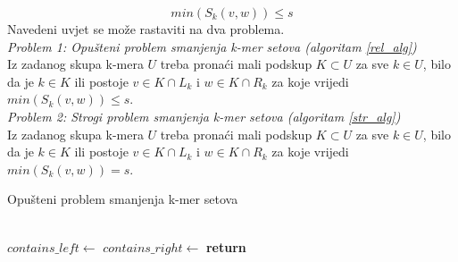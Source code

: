 \documentclass[times, utf8, seminar, numeric]{fer}
\begin{document}
\begin{equation}
  \label{distance}
  min(S_k(v,w)) \leq s
\end{equation}
Navedeni uvjet se može rastaviti na dva problema.\\
\textit{Problem 1: Opušteni problem smanjenja k-mer setova (algoritam \ref{rel_alg})}\nopagebreak\\
Iz zadanog skupa k-mera {$U$} treba pronaći mali podskup {$K \subset U$} za sve
{$k \in U$}, bilo da je {$k \in K$} ili postoje {$v \in K \cap L_k$} i
{$w \in K \cap R_k$} za koje vrijedi {$min(S_k(v,w)) \leq s$}.\\
\textit{Problem 2: Strogi problem smanjenja k-mer setova (algoritam \ref{str_alg})}\nopagebreak\\
Iz zadanog skupa k-mera {$U$} treba pronaći mali podskup {$K \subset U$} za sve
{$k \in U$}, bilo da je {$k \in K$} ili postoje {$v \in K \cap L_k$} i
{$w \in K \cap R_k$} za koje vrijedi {$min(S_k(v,w)) = s$}.\\

\begin{algorithm}[H]
  \caption{Opušteni problem smanjenja k-mer setova \cite{kbf}}
  \label{rel_alg}
  \algnewcommand{}
  \begin{algorithmic}[1]
      \EndIf
        \EndIf
      \EndIf
    \EndFunction\\
      \State $contains\_left \gets$ 
      \State $contains\_right \gets$ 
      \State \textbf{return} 
    \EndFunction\\
        \EndIf
      \Else
          \EndIf
        \EndFor
      \EndIf
    \EndFunction
  \end{algorithmic}
\end{algorithm}
\end{document}
